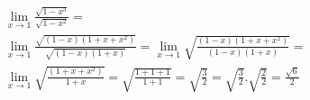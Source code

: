 \begin{ex}
\begin{align}
&\lim_{x\rightarrow 1} \frac{\sqrt{1-x^3}}{\sqrt{1-x^2}}=\nonumber\\
&\lim_{x\rightarrow 1} \frac{\sqrt{(1-x)(1+x+x^2)}}{\sqrt{(1-x)(1+x)}}=\lim_{x\rightarrow 1} \sqrt{\frac{(1-x)(1+x+x^2)}{(1-x)(1+x)}}=\nonumber\\
&\lim_{x\rightarrow 1} \sqrt{\frac{(1+x+x^2)}{1+x}}=\sqrt{\frac{1+1+1}{1+1}}=\sqrt{\frac{3}{2}}=\sqrt{\frac{3}{2}}.\sqrt{\frac{2}{2}}=\frac{\sqrt{6}}{2}\nonumber
\end{align}
\end{ex}